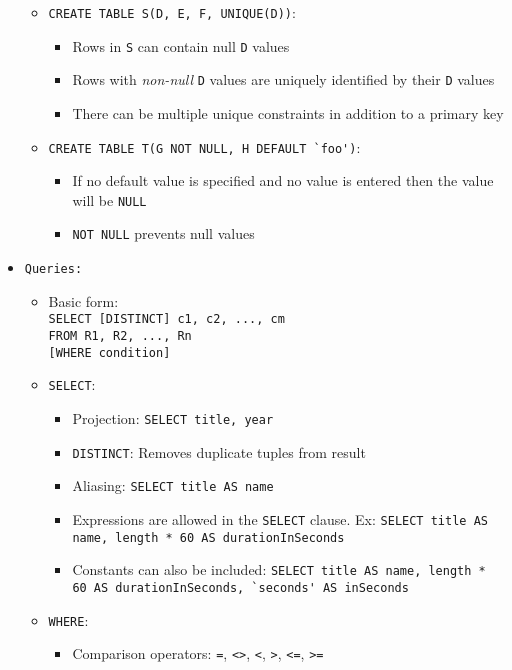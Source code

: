 \documentclass[landscape,8pt]{extarticle}
\newcommand{\code}{\lstinline}
\begin{document}
\begin{multicols}{4}
\begin{itemize}
\begin{itemize}
        \item \code{CREATE TABLE S(D, E, F, UNIQUE(D))}:
        \begin{itemize}
            \item Rows in \code{S} can contain null \code{D} values
            \item Rows with \emph{non-null} \code{D} values are uniquely identified by their \code{D} values
            \item There can be multiple unique constraints in addition to a primary key
        \end{itemize}
        \item \code{CREATE TABLE T(G NOT NULL, H DEFAULT `foo')}:
        \begin{itemize}
            \item If no default value is specified and no value is entered then the value will be \code{NULL}
            \item \code{NOT NULL} prevents null values
        \end{itemize}
    \end{itemize}
    \item \code{Queries:}
    \begin{itemize}
        \item Basic form: \\
\code{SELECT [DISTINCT] c1, c2, ..., cm} \\
\code{FROM R1, R2, ..., Rn} \\
\code{[WHERE condition]}
    \item \code{SELECT}:
    \begin{itemize}
        \item Projection: \code{SELECT title, year}
        \item \code{DISTINCT}: Removes duplicate tuples from result
        \item Aliasing: \code{SELECT title AS name}
        \item Expressions are allowed in the \code{SELECT} clause. Ex: \code{SELECT title AS name, length * 60 AS durationInSeconds}
        \item Constants can also be included: \code{SELECT title AS name, length * 60 AS durationInSeconds, `seconds' AS inSeconds}
    \end{itemize}
        \item \code{WHERE}:
        \begin{itemize}
            \item Comparison operators: \code{=}, \code{<>}, \code{<}, \code{>}, \code{<=}, \code{>=}

\end{itemize}
\end{itemize}
\end{itemize}
\end{multicols}
\end{document}
